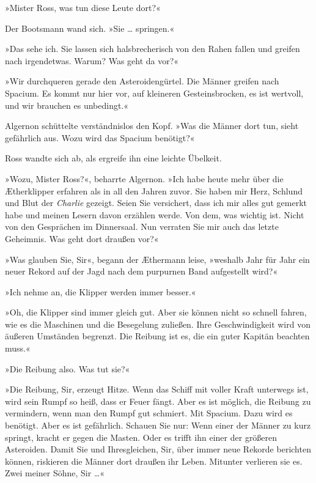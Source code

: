 »Mister Ross, was tun diese Leute dort?«

Der Bootsmann wand sich. »Sie \ldots{} springen.«

»Das sehe ich. Sie lassen sich halsbrecherisch von den Rahen fallen
und greifen nach irgendetwas. Warum? Was geht da vor?«

»Wir durchqueren gerade den Asteroidengürtel. Die Männer greifen
nach Spacium. Es kommt nur hier vor, auf kleineren Gesteinsbrocken,
es ist wertvoll, und wir brauchen es unbedingt.«

Algernon schüttelte verständnislos den Kopf. »Was die Männer dort
tun, sieht gefährlich aus. Wozu wird das Spacium benötigt?«

\bigpar

Ross wandte sich ab, als ergreife ihn eine leichte Übelkeit.

»Wozu, Mister Ross?«, beharrte Algernon. »Ich habe heute mehr über
die Ætherklipper erfahren als in all den Jahren zuvor. Sie haben
mir Herz, Schlund und Blut der \textit{Charlie} gezeigt. Seien Sie
versichert, dass ich mir alles gut gemerkt habe und meinen Lesern
davon erzählen werde. Von dem, was wichtig ist. Nicht von den
Gesprächen im Dinnersaal. Nun verraten Sie mir auch das letzte
Geheimnis. Was geht dort draußen vor?«

»Was glauben Sie, Sir«, begann der Æthermann leise, »weshalb Jahr
für Jahr ein neuer Rekord auf der Jagd nach dem purpurnen Band
aufgestellt wird?«

»Ich nehme an, die Klipper werden immer besser.«

»Oh, die Klipper sind immer gleich gut. Aber sie können nicht so
schnell fahren, wie es die Maschinen und die Besegelung zuließen.
Ihre Geschwindigkeit wird von äußeren Umständen begrenzt. Die
Reibung ist es, die ein guter Kapitän beachten muss.«

»Die Reibung also. Was tut sie?«

»Die Reibung, Sir, erzeugt Hitze. Wenn das Schiff mit voller Kraft
unterwegs ist, wird sein Rumpf so heiß, dass er Feuer fängt. Aber
es ist möglich, die Reibung zu vermindern, wenn man den Rumpf gut
schmiert. Mit Spacium. Dazu wird es benötigt. Aber es ist
gefährlich. Schauen Sie nur: Wenn einer der Männer zu kurz springt,
kracht er gegen die Masten. Oder es trifft ihn einer der größeren
Asteroiden. Damit Sie und Ihresgleichen, Sir, über immer neue
Rekorde berichten können, riskieren die Männer dort draußen ihr
Leben. Mitunter verlieren sie es. Zwei meiner Söhne, Sir \ldots{}«

